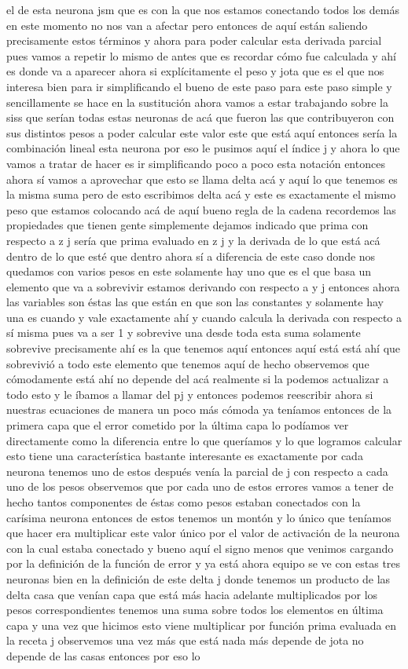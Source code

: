 el de esta neurona jsm que es con la que nos estamos conectando todos los demás en este momento no nos van a afectar pero entonces de aquí están saliendo precisamente estos términos y ahora para poder calcular esta derivada parcial pues vamos a repetir lo mismo de antes que es recordar cómo fue calculada y ahí es donde va a aparecer ahora si explícitamente el peso y jota que es el que nos interesa bien para ir simplificando el bueno de este paso para este paso simple y sencillamente se hace en la sustitución ahora vamos a estar trabajando sobre la siss que serían todas estas neuronas de acá que fueron las que contribuyeron con sus distintos pesos a poder calcular este valor este que está aquí entonces sería la combinación lineal esta neurona por eso le pusimos aquí el índice j y ahora lo que vamos a tratar de hacer es ir simplificando poco a poco esta notación entonces ahora sí vamos a aprovechar que esto se llama delta acá y aquí lo que tenemos es la misma suma pero de esto escribimos delta acá y este es exactamente el mismo peso que estamos colocando acá de aquí bueno regla de la cadena recordemos las propiedades que tienen gente simplemente dejamos indicado que prima con respecto a z j sería que prima evaluado en z j y la derivada de lo que está acá dentro de lo que esté que dentro ahora sí a diferencia de este caso donde nos quedamos con varios pesos en este solamente hay uno que es el que basa un elemento que va a sobrevivir estamos derivando con respecto a y j entonces ahora las variables son éstas las que están en que son las constantes y solamente hay una es cuando y vale exactamente ahí y cuando calcula la derivada con respecto a sí misma pues va a ser 1 y sobrevive una desde toda esta suma solamente sobrevive precisamente ahí es la que tenemos aquí entonces aquí está está ahí que sobrevivió a todo este elemento que tenemos aquí de hecho observemos que cómodamente está ahí no depende del acá realmente si la podemos actualizar a todo esto y le íbamos a llamar del pj y entonces podemos reescribir ahora si nuestras ecuaciones de manera un poco más cómoda ya teníamos entonces de la primera capa que el error cometido por la última capa lo podíamos ver directamente como la diferencia entre lo que queríamos y lo que logramos calcular esto tiene una característica bastante interesante es exactamente por cada neurona tenemos uno de estos después venía la parcial de j con respecto a cada uno de los pesos observemos que por cada uno de estos errores vamos a tener de hecho tantos componentes de éstas como pesos estaban conectados con la carísima neurona entonces de estos tenemos un montón y lo único que teníamos que hacer era multiplicar este valor único por el valor de activación de la neurona con la cual estaba conectado y bueno aquí el signo menos que venimos cargando por la definición de la función de error y ya está ahora equipo se ve con estas tres neuronas bien en la definición de este delta j donde tenemos un producto de las delta casa que venían capa que está más hacia adelante multiplicados por los pesos correspondientes tenemos una suma sobre todos los elementos en última capa y una vez que hicimos esto viene multiplicar por función prima evaluada en la receta j observemos una vez más que está nada más depende de jota no depende de las casas entonces por eso lo 